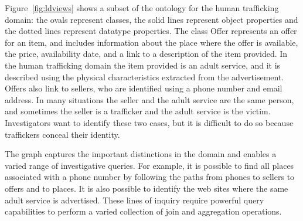 Figure~\ref{fig:ldviews} shows a subset of the ontology for the human trafficking domain: the ovals represent classes, the solid lines represent object properties and the dotted lines represent datatype properties.
The class Offer represents an offer for an item, and includes information about the place where the offer is available, the price, availability date, and a link to a description of the item provided.
In the human trafficking domain the item provided is an adult service, and it is described using the physical characteristics extracted from the advertisement. 
Offers also link to sellers, who are identified using a phone number and email address.
In many situations the seller and the adult service are the same person, and sometimes the seller is a trafficker and the adult service is the victim.
Investigators want to identify these two cases, but it is difficult to do so because traffickers conceal their identity.

The graph captures the important distinctions in the domain and enables a varied range of investigative queries.
For example, it is possible to find all places associated with a phone number by following the paths from phones to sellers to offers and to places.
It is also possible to identify the web sites where the same adult service is advertised.
These lines of inquiry require powerful query capabilities to perform a varied collection of join and aggregation operations.